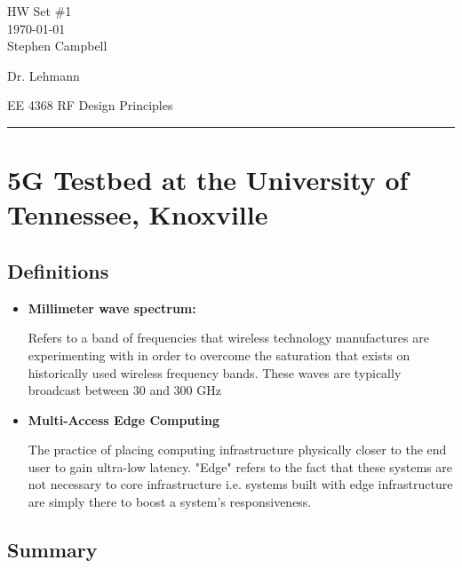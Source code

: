 \documentclass{article}
\begin{document}
\begingroup  
    \centering
    \LARGE HW Set \#1\\[0.5em]
    \large \today\\[0.5em]
    \large Stephen Campbell\par
    \large Dr. Lehmann \par
    \large EE 4368 RF Design Principles\par
\endgroup
\rule{\textwidth}{0.4pt}


\section*{5G Testbed at the University of Tennessee, Knoxville}


\subsection*{Definitions}
\begin{itemize}
  \item \textbf{Millimeter wave spectrum:}

  Refers to a band of frequencies that wireless
  technology manufactures are experimenting with in order to overcome the saturation
  that exists on historically used wireless frequency bands. These waves are 
  typically broadcast between 30 and 300 GHz
  \item \textbf{Multi-Access Edge Computing}

  The practice of placing computing infrastructure physically closer to the end user to 
  gain ultra-low latency. "Edge" refers to the fact that these systems are not necessary
  to core infrastructure i.e. systems built with edge infrastructure are simply there to
  boost a system's responsiveness.
\end{itemize}



\subsection*{Summary}
\end{document}
